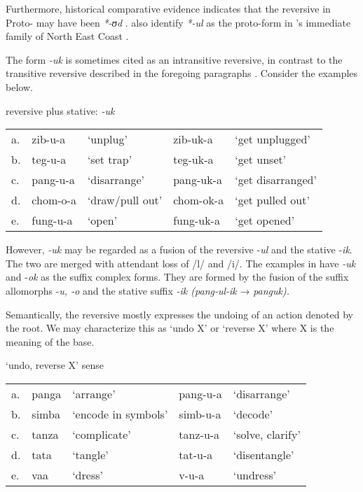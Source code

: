 \documentclass[output=paper]{langsci/langscibook}
\begin{document}
Furthermore, historical comparative evidence indicates that the reversive in Proto- may have been \textit{*-ʊd} \citep{Schadeberg2003,Meeussen1967}. \citet[370]{NurseHinnebusch1993} also identify \textit{*-ul} as the proto-form in ’s immediate family of North East Coast . 

The form \textit{-uk} is sometimes cited as an intransitive reversive, in contrast to the transitive reversive described in the foregoing paragraphs \citep[239]{Ashton1947}. Consider the examples below.

\ea\label{ex:ngonyaningowa:6} {reversive plus stative: \textit{-uk}}
\begin{tabularx}{\textwidth}{lllll}
a.\label{ex:ngonyaningowa:6a} & {zib-u-a} & {‘unplug’} & {zib-uk-a} & {‘get unplugged’}\\
b.\label{ex:ngonyaningowa:6b} & {teg-u-a} & {‘set trap’} & {teg-uk-a} & {‘get unset’}\\
c.\label{ex:ngonyaningowa:6c} & {pang-u-a} & {‘disarrange’} & {pang-uk-a} & {‘get disarranged’}\\
d.\label{ex:ngonyaningowa:6d} & {chom-o-a} & {‘draw/pull out’} & {chom-ok-a} & {‘get pulled out’}\\
e.\label{ex:ngonyaningowa:6e} & {fung-u-a} &  {‘open’} & {fung-uk-a} & {‘get opened’}
\end{tabularx}
\z

However, \textit{-uk} may be regarded as a fusion of the reversive -\textit{ul} and the stative -\textit{ik}. The two are merged with attendant loss of /l/ and /i/. The examples in  have \textit{-uk} and -\textit{ok} as the suffix complex forms. They are formed by the fusion of the suffix allomorphs -\textit{u, -o} and the stative suffix \textit{-ik (pang-ul-ik }→ \textit{panguk).} 

  Semantically, the reversive mostly expresses the undoing of an action denoted by the root. We may characterize this as ‘undo X’ or ‘reverse X’ where X is the meaning of the base.

\ea\label{ex:ngonyaningowa:7} {`undo, reverse X'  sense}
\begin{tabularx}{\textwidth}{lllll}
a.\label{ex:ngonyaningowa:7a} & {panga} & {‘arrange’} & {pang-u-a} & {‘disarrange’}\\
b.\label{ex:ngonyaningowa:7b} & {simba} & {‘encode in symbols’} & {simb-u-a} & {‘decode’}\\
c.\label{ex:ngonyaningowa:7c} & {tanza} & {‘complicate’} & {tanz-u-a} & {‘solve, clarify’}\\
d.\label{ex:ngonyaningowa:7d} & {tata} & {‘tangle’} & {tat-u-a} & {‘disentangle’}\\
e.\label{ex:ngonyaningowa:7e} & {vaa} & {‘dress’} & {v-u-a} & {‘undress’}
\end{tabularx}
\z
\end{document}
